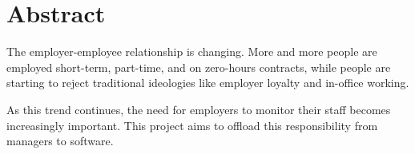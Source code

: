 \chapter*{Abstract}

The employer-employee relationship is changing. More and
more people are employed short-term, part-time, and on
zero-hours contracts, while people are starting to reject 
traditional ideologies like employer loyalty and in-office
working.

As this trend continues, the need for employers to monitor
their staff becomes increasingly important. This project
aims to offload this responsibility from managers to 
software.
